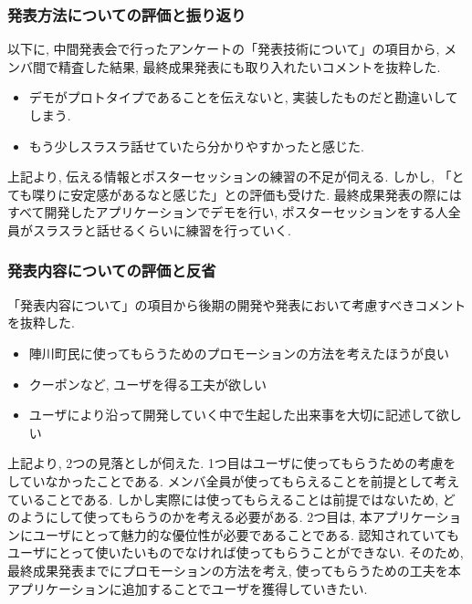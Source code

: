\subsubsection{発表方法についての評価と振り返り}
以下に, 中間発表会で行ったアンケートの「発表技術について」の項目から, メンバ間で精査した結果, 最終成果発表にも取り入れたいコメントを抜粋した.
\begin{itemize}
  \item デモがプロトタイプであることを伝えないと, 実装したものだと勘違いしてしまう.
  \item もう少しスラスラ話せていたら分かりやすかったと感じた.
\end{itemize}
    上記より, 伝える情報とポスターセッションの練習の不足が伺える.
    しかし, 「とても喋りに安定感があるなと感じた」との評価も受けた. 最終成果発表の際にはすべて開発したアプリケーションでデモを行い,
    ポスターセッションをする人全員がスラスラと話せるくらいに練習を行っていく.

\subsubsection{発表内容についての評価と反省}
    「発表内容について」の項目から後期の開発や発表において考慮すべきコメントを抜粋した.
\begin{itemize}
  \item 陣川町民に使ってもらうためのプロモーションの方法を考えたほうが良い
  \item クーポンなど, ユーザを得る工夫が欲しい
  \item ユーザにより沿って開発していく中で生起した出来事を大切に記述して欲しい
\end{itemize}
    上記より, 2つの見落としが伺えた. 1つ目はユーザに使ってもらうための考慮をしていなかったことである.
    メンバ全員が使ってもらえることを前提として考えていることである. しかし実際には使ってもらえることは前提ではないため,
    どのようにして使ってもらうのかを考える必要がある. 2つ目は, 本アプリケーションにユーザにとって魅力的な優位性が必要であることである.
    認知されていてもユーザにとって使いたいものでなければ使ってもらうことができない. そのため, 最終成果発表までにプロモーションの方法を考え,
    使ってもらうための工夫を本アプリケーションに追加することでユーザを獲得していきたい.


